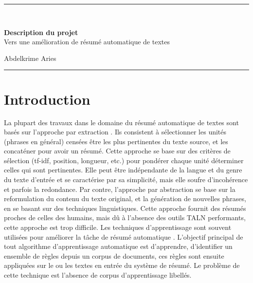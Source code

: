 \documentclass[12pt, a4paper]{article}
\begin{document}

\noindent\rule{\textwidth}{1pt}\\[0.25cm]
\noindent
\begin{center}
{\LARGE \textbf{Description du projet}}\\
Vers une amélioration de résumé automatique de textes
\begin{flushright}
	Abdelkrime Aries
\end{flushright}
\end{center}
\noindent\rule{\textwidth}{1pt}

\section{Introduction}

La plupart des travaux dans le domaine du résumé automatique de textes sont basés sur l'approche par extraction \cite{58-luhn,69-edmundson}. 
Ils consistent à sélectionner les unités (phrases en général) censées être les plus pertinentes du texte source, et les concaténer pour avoir un résumé. 
Cette approche se base sur des critères de sélection (tf-idf, position, longueur, etc.) pour pondérer chaque unité déterminer celles qui sont pertinentes. 
Elle peut être indépendante de la langue et du genre du texte d’entrée et se caractérise par sa simplicité, mais elle soufre d’incohérence et parfois la redondance.
Par contre, l'approche par abstraction se base sur la reformulation du contenu du texte original, et la génération de nouvelles phrases, en se basant sur des techniques linguistiques. 
Cette approche fournit des résumés proches de celles des humains, mais dû à l’absence des outils TALN performants, cette approche est trop difficile.
Les techniques d'apprentissage sont souvent utilisées pour améliorer la tâche de résumé automatique \cite{05-yeh-al, 08-wong-al,10-yatsko-al}. 
L'objectif principal de tout algorithme d'apprentissage automatique est d'apprendre, d'identifier un ensemble de règles depuis un corpus de documents, ces règles sont ensuite appliquées sur le ou les textes en entrée du système de résumé. 
Le problème de cette technique est l'absence de corpus d'apprentissage libellés.
\end{document}

